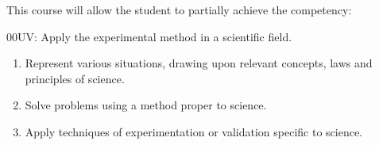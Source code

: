 {This course will allow the student to partially achieve the competency:

00UV: Apply the experimental method in a scientific field.
\begin{enumerate}
\item Represent various situations, drawing upon relevant concepts, laws and principles of science.
\item Solve problems using a method proper to science.
\item Apply techniques of experimentation or validation specific to science.
\end{enumerate}

}
